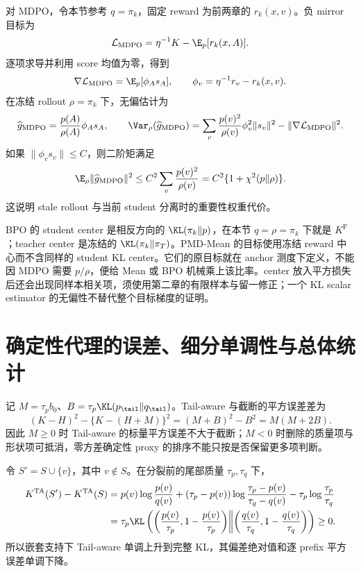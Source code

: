 对 MDPO，令本节参考 $q=\pi_k$，固定 reward 为前两章的 $r_k(x,v)$。负 mirror 目标为
\[
 \mathcal L_{\mathrm{MDPO}}
 =\eta^{-1}K-\E_p[r_k(x,A)].
\]
逐项求导并利用 score 均值为零，得到
\[
 \nabla\mathcal L_{\mathrm{MDPO}}
 =\E_p[\phi_As_A],\qquad
 \phi_v=\eta^{-1}r_v-r_k(x,v).
\]
在冻结 rollout $\rho=\pi_k$ 下，无偏估计为
\[
 \widehat g_{\mathrm{MDPO}}=\frac{p(A)}{\rho(A)}\phi_As_A,\qquad
 \Var_\rho(\widehat g_{\mathrm{MDPO}})
 =\sum_v\frac{p(v)^2}{\rho(v)}\phi_v^2\lVert s_v\rVert^2
  -\lVert\nabla\mathcal L_{\mathrm{MDPO}}\rVert^2.
\]
如果 $\lVert\phi_vs_v\rVert\leq C$，则二阶矩满足
\begin{equation}
 \E_\rho\lVert\widehat g_{\mathrm{MDPO}}\rVert^2
 \leq C^2\sum_v\frac{p(v)^2}{\rho(v)}
 =C^2\{1+\chi^2(p\Vert\rho)\}.
 \label{eq:mdpo-variance}
\end{equation}
这说明 stale rollout 与当前 student 分离时的重要性权重代价。

BPO 的 student center 是相反方向的 $\KL(\pi_k\Vert p)$，在本节 $q=\rho=\pi_k$ 下就是 $K^{\mathrm F}$；teacher center 是冻结的 $\KL(\pi_k\Vert\pi_T)$。PMD-Mean 的目标使用冻结 reward 中心而不含同样的 student KL center。它们的原目标就在 anchor 测度下定义，不能因 MDPO 需要 $p/\rho$，便给 Mean 或 BPO 机械乘上该比率。center 放入平方损失后还会出现同样本相关项，须使用第二章的有限样本与留一修正；一个 KL scalar estimator 的无偏性不替代整个目标梯度的证明。

\section{确定性代理的误差、细分单调性与总体统计}

记 $M=\tau_pb_0$、$B=\tau_p\KL(p_{\tail}\Vert q_{\tail})$。Tail-aware 与截断的平方误差差为
\[
 (K-H)^2-\{K-(H+M)\}^2=(M+B)^2-B^2=M(M+2B).
\]
因此 $M\geq0$ 时 Tail-aware 的标量平方误差不大于截断；$M<0$ 时删除的质量项与形状项可抵消，零方差确定性 proxy 的排序不能只按是否保留更多项判断。

\begin{proposition}
令 $S'=S\cup\{v\}$，其中 $v\notin S$。在分裂前的尾部质量 $\tau_p,\tau_q$ 下，
\begin{align*}
 K^{\mathrm{TA}}(S')-K^{\mathrm{TA}}(S)
 &=p(v)\log\frac{p(v)}{q(v)}
  +(\tau_p-p(v))\log\frac{\tau_p-p(v)}{\tau_q-q(v)}
  -\tau_p\log\frac{\tau_p}{\tau_q}\\
 &=\tau_p\KL\left(
 \left(\frac{p(v)}{\tau_p},1-\frac{p(v)}{\tau_p}\right)
 \middle\Vert
 \left(\frac{q(v)}{\tau_q},1-\frac{q(v)}{\tau_q}\right)\right)\geq0.
\end{align*}
所以嵌套支持下 Tail-aware 单调上升到完整 KL，其偏差绝对值和逐 prefix 平方误差单调下降。
\end{proposition}

